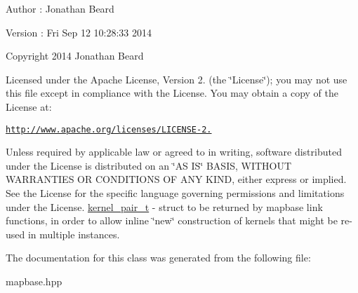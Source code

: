 \begin{DoxyAuthor}{Author}
\+: Jonathan Beard 
\end{DoxyAuthor}
\begin{DoxyVersion}{Version}
\+: Fri Sep 12 10\+:28\+:33 2014
\end{DoxyVersion}
Copyright 2014 Jonathan Beard

Licensed under the Apache License, Version 2. (the \char`\"{}\+License\char`\"{}); you may not use this file except in compliance with the License. You may obtain a copy of the License at\+:

\href{http://www.apache.org/licenses/LICENSE-2.0}{\tt http\+://www.\+apache.\+org/licenses/\+L\+I\+C\+E\+N\+S\+E-\/2.}

Unless required by applicable law or agreed to in writing, software distributed under the License is distributed on an \char`\"{}\+A\+S I\+S\char`\"{} B\+A\+S\+I\+S, W\+I\+T\+H\+O\+U\+T W\+A\+R\+R\+A\+N\+T\+I\+E\+S O\+R C\+O\+N\+D\+I\+T\+I\+O\+N\+S O\+F A\+N\+Y K\+I\+N\+D, either express or implied. See the License for the specific language governing permissions and limitations under the License. \hyperlink{classkernel__pair__t}{kernel\+\_\+pair\+\_\+t} -\/ struct to be returned by mapbase link functions, in order to allow inline \char`\"{}new\char`\"{} construction of kernels that might be re-\/used in multiple instances. 

The documentation for this class was generated from the following file\+:\begin{DoxyCompactItemize}
\item 
mapbase.\+hpp\end{DoxyCompactItemize}
